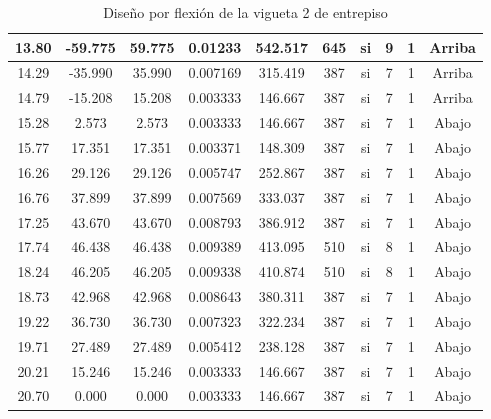 \begin{table}[H]
{\begin{tabular}{|c|c|c|c|c|c|c|c|c|c|}
    13.80 & -59.775 & 59.775 & 0.01233 & 542.517 & 645 & si  & 9   & 1   & Arriba \bigstrut\\
    \hline
    14.29 & -35.990 & 35.990 & 0.007169 & 315.419 & 387 & si  & 7   & 1   & Arriba \bigstrut\\
    \hline
    14.79 & -15.208 & 15.208 & 0.003333 & 146.667 & 387 & si  & 7   & 1   & Arriba \bigstrut\\
    \hline
    15.28 & 2.573 & 2.573 & 0.003333 & 146.667 & 387 & si  & 7   & 1   & Abajo \bigstrut\\
    \hline
    15.77 & 17.351 & 17.351 & 0.003371 & 148.309 & 387 & si  & 7   & 1   & Abajo \bigstrut\\
    \hline
    16.26 & 29.126 & 29.126 & 0.005747 & 252.867 & 387 & si  & 7   & 1   & Abajo \bigstrut\\
    \hline
    16.76 & 37.899 & 37.899 & 0.007569 & 333.037 & 387 & si  & 7   & 1   & Abajo \bigstrut\\
    \hline
    17.25 & 43.670 & 43.670 & 0.008793 & 386.912 & 387 & si  & 7   & 1   & Abajo \bigstrut\\
    \hline
    17.74 & 46.438 & 46.438 & 0.009389 & 413.095 & 510 & si  & 8   & 1   & Abajo \bigstrut\\
    \hline
    18.24 & 46.205 & 46.205 & 0.009338 & 410.874 & 510 & si  & 8   & 1   & Abajo \bigstrut\\
    \hline
    18.73 & 42.968 & 42.968 & 0.008643 & 380.311 & 387 & si  & 7   & 1   & Abajo \bigstrut\\
    \hline
    19.22 & 36.730 & 36.730 & 0.007323 & 322.234 & 387 & si  & 7   & 1   & Abajo \bigstrut\\
    \hline
    19.71 & 27.489 & 27.489 & 0.005412 & 238.128 & 387 & si  & 7   & 1   & Abajo \bigstrut\\
    \hline
    20.21 & 15.246 & 15.246 & 0.003333 & 146.667 & 387 & si  & 7   & 1   & Abajo \bigstrut\\
    \hline
    20.70 & 0.000 & 0.000 & 0.003333 & 146.667 & 387 & si  & 7   & 1   & Abajo \bigstrut\\
    \hline
    \end{tabular}%

}%
      \caption{Diseño por flexión de la vigueta 2 de entrepiso}
  \label{tab:F VT2 EP}%
\end{table}%

